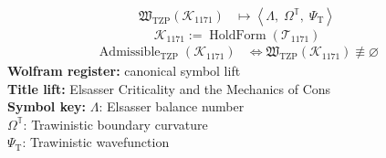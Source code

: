 \noindent
\begin{minipage}[t]{0.48\linewidth}
\begingroup
\small
\[
\begin{aligned}
\mathfrak{W}_{\mathrm{TZP}}\!\left(\mathcal{K}_{1171}\right)
&\longmapsto
\left\langle \Lambda,\; \Omega^{\mathbb{T}},\; \Psi_{\mathrm{T}} \right\rangle
\end{aligned}
\]
\[
\mathcal{K}_{1171}
:=
\operatorname{HoldForm}\!\left(\mathcal{T}_{1171}\right)
\]
\[
\begin{aligned}
\operatorname{Admissible}_{\mathrm{TZP}}\!\left(\mathcal{K}_{1171}\right)
&\Longleftrightarrow
\mathfrak{W}_{\mathrm{TZP}}\!\left(\mathcal{K}_{1171}\right)\not\equiv\varnothing
\end{aligned}
\]
\textbf{Wolfram register:} canonical symbol lift\\
\textbf{Title lift:} Elsasser Criticality and the Mechanics of Cons\\
\textbf{Symbol key:} \(\Lambda\): Elsasser balance number\\ \(\Omega^{\mathbb{T}}\): Trawinistic boundary curvature\\ \(\Psi_{\mathrm{T}}\): Trawinistic wavefunction
\par
\endgroup
\end{minipage}\hfill
